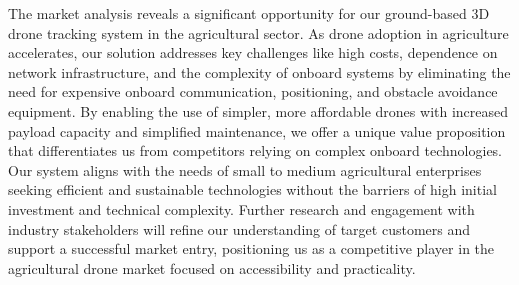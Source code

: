The market analysis reveals a significant opportunity for our ground-based 3D drone tracking system in the agricultural sector. As drone adoption in agriculture accelerates, our solution addresses key challenges like high costs, dependence on network infrastructure, and the complexity of onboard systems by eliminating the need for expensive onboard communication, positioning, and obstacle avoidance equipment. By enabling the use of simpler, more affordable drones with increased payload capacity and simplified maintenance, we offer a unique value proposition that differentiates us from competitors relying on complex onboard technologies. Our system aligns with the needs of small to medium agricultural enterprises seeking efficient and sustainable technologies without the barriers of high initial investment and technical complexity. Further research and engagement with industry stakeholders will refine our understanding of target customers and support a successful market entry, positioning us as a competitive player in the agricultural drone market focused on accessibility and practicality.